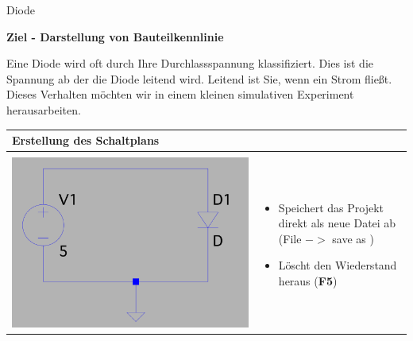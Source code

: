 \begin{frame}[t]{Diode}

    \textbf{Ziel - Darstellung von Bauteilkennlinie}
    
    \begin{spacing}{0.6} \begin{tiny}
    
    Eine Diode wird oft durch Ihre Durchlassspannung klassifiziert. Dies ist die Spannung ab der die Diode leitend wird. Leitend ist Sie, wenn ein Strom fließt. Dieses Verhalten möchten
    wir in einem kleinen simulativen Experiment herausarbeiten. 
    \end{tiny} \end{spacing}
    \begin{spacing}{0.9} \begin{tiny}
    \begin{table}[h!]
      \begin{tabular}{p{3cm} p{7cm}}
        \hline
        \textbf{Erstellung des Schaltplans} & \\
        \hline \\
        \begin{minipage}{.3\textwidth}
          \includegraphics[width=\linewidth]{pictures/diode.png}
        \end{minipage} 
        & 
        \begin{minipage}{.7\textwidth}
        \begin{itemize}
          \item Speichert das Projekt direkt als neue Datei ab (File $->$ save as ) 
          \item Löscht den Wiederstand heraus (\textbf{F5}) 

\end{itemize}
\end{minipage}
\end{tabular}
\end{table}
\end{tiny}
\end{spacing}
\end{frame}
